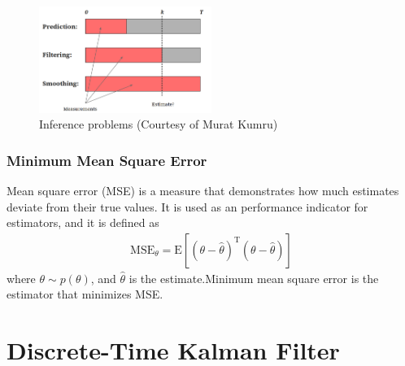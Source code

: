 \documentclass[twoside]{article}
\renewcommand{\t}{^\mathrm{T}{}}
\newcommand{\E}{\mathrm{E}{}}
\begin{document}
\begin{figure}[!h]
	\centering
	\includegraphics[trim={0cm 0cm 0cm 0cm},clip,width=0.5\textwidth]{figures/inference}
	\caption{Inference problems (Courtesy of Murat Kumru)}
	\label{fig:Inference}
\end{figure}

\subsubsection*{Minimum Mean Square Error}
Mean square error (MSE) is a measure that demonstrates how much estimates deviate from their true values. It is used as an performance indicator for estimators, and it is defined as
\begin{align*}
	\textrm{MSE}_\theta = \E\left[(\theta-\hat \theta)\t(\theta-\hat \theta) \right]  
\end{align*}
where $\theta \sim p(\theta)$,  and  $\hat\theta$ is the estimate.Minimum mean square error is the estimator that minimizes MSE. 

\newpage

\section*{Discrete-Time Kalman Filter}
\end{document}
